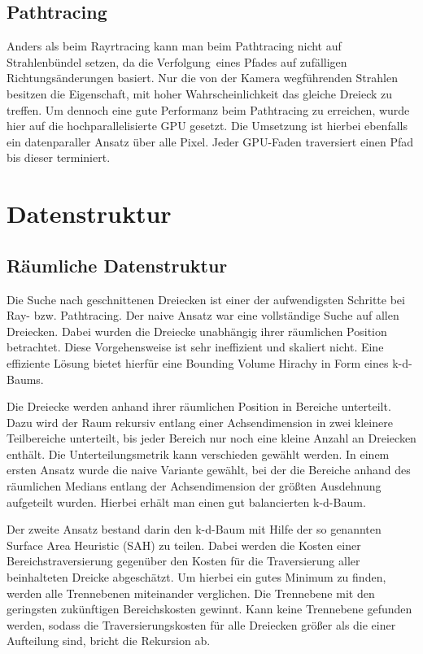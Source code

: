\subsection{Pathtracing}
\label{sec:path_tracer}
Anders als beim Rayrtracing kann man beim Pathtracing nicht auf Strahlenbündel setzen, da die \glqq Verfolgung\grqq\ eines Pfades auf zufälligen Richtungsänderungen basiert. Nur die von der Kamera wegführenden Strahlen besitzen die Eigenschaft, mit hoher Wahrscheinlichkeit das gleiche Dreieck zu treffen. Um dennoch eine gute Performanz beim Pathtracing zu erreichen, wurde hier auf die hochparallelisierte GPU gesetzt. Die Umsetzung ist hierbei ebenfalls ein datenparaller Ansatz über alle Pixel. Jeder GPU-Faden traversiert einen Pfad bis dieser terminiert.

\section{Datenstruktur}
\subsection{Räumliche Datenstruktur}
\label{sec:kdTree}
Die Suche nach geschnittenen Dreiecken ist einer der aufwendigsten Schritte bei Ray- bzw. Pathtracing. Der naive Ansatz war eine vollständige Suche auf allen Dreiecken. Dabei wurden die Dreiecke unabhängig ihrer räumlichen Position betrachtet. Diese Vorgehensweise ist sehr ineffizient und skaliert nicht. Eine effiziente Lösung bietet hierfür eine Bounding Volume Hirachy in Form eines k-d-Baums.

Die Dreiecke werden anhand ihrer räumlichen Position in Bereiche unterteilt. Dazu wird der Raum rekursiv entlang einer Achsendimension in zwei kleinere Teilbereiche unterteilt, bis jeder Bereich nur noch eine kleine Anzahl an Dreiecken enthält. Die Unterteilungsmetrik kann verschieden gewählt werden.
In einem ersten Ansatz wurde die naive Variante gewählt, bei der die Bereiche anhand des räumlichen Medians entlang der Achsendimension der größten Ausdehnung aufgeteilt wurden. Hierbei erhält man einen gut balancierten k-d-Baum.

Der zweite Ansatz bestand darin den k-d-Baum mit Hilfe der so genannten Surface Area Heuristic (SAH) zu teilen. Dabei werden die Kosten einer Bereichstraversierung gegenüber den Kosten für die Traversierung aller beinhalteten Dreicke abgeschätzt. Um hierbei ein gutes Minimum zu finden, werden alle Trennebenen miteinander verglichen. Die Trennebene mit den geringsten zukünftigen Bereichskosten gewinnt. Kann keine Trennebene gefunden werden, sodass die Traversierungskosten für alle Dreiecken größer als die einer Aufteilung sind, bricht die Rekursion ab.

